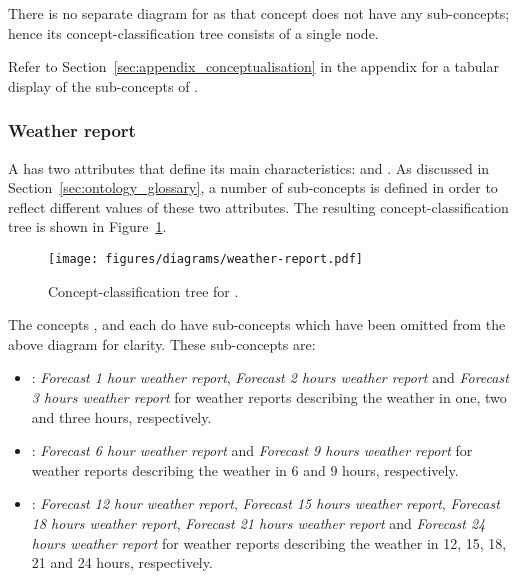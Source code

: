 There is no separate diagram for  as that concept does not have any sub-concepts; hence its concept-classification tree consists of a single node.

Refer to Section~\ref{sec:appendix_conceptualisation} in the appendix for a tabular display of the sub-concepts of .

\subsubsection{Weather report}

A  has two attributes that define its main characteristics:  and . As discussed in Section~\ref{sec:ontology_glossary}, a number of sub-concepts is defined in order to reflect different values of these two attributes. The resulting concept-classification tree is shown in Figure~\ref{fig:tree_weather_report}.

\begin{figure}
  \centering
  \texttt{[image: figures/diagrams/weather-report.pdf]}
  \caption[Concept-classification tree for ]{Concept-classification tree for .}
  \label{fig:tree_weather_report}
\end{figure}

The concepts ,  and  each do have sub-concepts which have been omitted from the above diagram for clarity. These sub-concepts are:
\begin{itemize}
  \item {}: \emph{Forecast 1 hour weather report}, \emph{Forecast 2 hours weather report} and \emph{Forecast 3 hours weather report} for weather reports describing the weather in one, two and three hours, respectively.
  \item {}: \emph{Forecast 6 hour weather report} and \emph{Forecast 9 hours weather report} for weather reports describing the weather in 6 and 9 hours, respectively.
  \item {}: \emph{Forecast 12 hour weather report}, \emph{Forecast 15 hours weather report}, \emph{Forecast 18 hours weather report}, \emph{Forecast 21 hours weather report} and \emph{Forecast 24 hours weather report} for weather reports describing the weather in 12, 15, 18, 21 and 24 hours, respectively.
\end{itemize}

